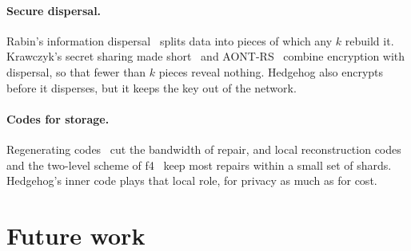 \documentclass[10pt,a4paper,final]{article}
\begin{document}
\paragraph{Secure dispersal.} Rabin's information dispersal~\cite{rabin1989} splits data into pieces of which any
$k$ rebuild it. Krawczyk's secret sharing made short~\cite{krawczyk1993} and AONT-RS~\cite{resch2011} combine
encryption with dispersal, so that fewer than $k$ pieces reveal nothing. Hedgehog also encrypts before it disperses,
but it keeps the key out of the network.

\paragraph{Codes for storage.} Regenerating codes~\cite{dimakis2010} cut the bandwidth of repair, and local
reconstruction codes~\cite{huang2012} and the two-level scheme of f4~\cite{muralidhar2014} keep most repairs within a
small set of shards. Hedgehog's inner code plays that local role, for privacy as much as for cost.

\section{Future work}
\label{sec:future}
\end{document}
